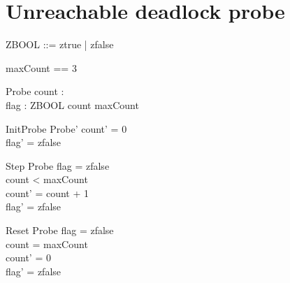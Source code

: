 \documentclass{article}
\begin{document}
\section{Unreachable deadlock probe}

\begin{zed}
  ZBOOL ::= ztrue | zfalse
\end{zed}

\begin{zed}
  maxCount == 3
\end{zed}

\begin{schema}{Probe}
  count : \nat \\
  flag : ZBOOL
\where
  count \leq maxCount
\end{schema}

\begin{schema}{InitProbe}
  Probe'
\where
  count' = 0 \\
  flag' = zfalse
\end{schema}

\begin{schema}{Step}
  \Delta Probe
\where
  flag = zfalse \\
  count < maxCount \\
  count' = count + 1 \\
  flag' = zfalse
\end{schema}

\begin{schema}{Reset}
  \Delta Probe
\where
  flag = zfalse \\
  count = maxCount \\
  count' = 0 \\
  flag' = zfalse
\end{schema}
\end{document}
